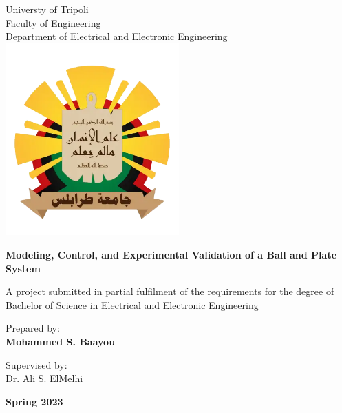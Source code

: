 \begin{titlepage}
\begin{center}
\begin{singlespace}

\vspace*{0.7cm}
\Large
Universty of Tripoli\\
Faculty of Engineering\\
Department of Electrical and Electronic Engineering \\
\includegraphics[width=0.5\textwidth ]{Figures/UOT_Logo.png}            

\Huge
\textbf{Modeling, Control, and Experimental Validation of a Ball and Plate System}

\vspace{0.5cm}
\Large
A project submitted in partial fulfilment of the requirements for the
degree of Bachelor of Science in Electrical and Electronic Engineering

\vspace{1.2cm}
Prepared by:\\
\textbf{Mohammed S. Baayou}

\vspace{0.8cm}
Supervised by:\\
Dr. Ali S. ElMelhi
                   
\vspace{1cm}
\large
\textbf{Spring 2023}


\end{singlespace}            
\end{center}
\end{titlepage}